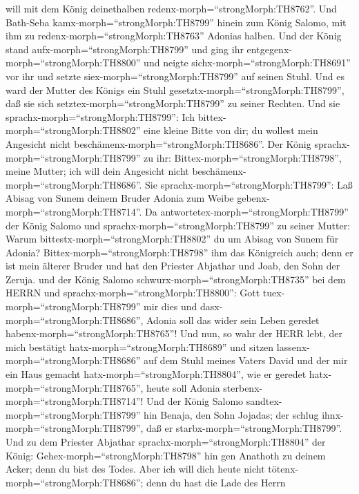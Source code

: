 will mit dem König deinethalben redenx-morph=``strongMorph:TH8762''.
 Und Bath-Seba kamx-morph=``strongMorph:TH8799'' hinein zum
König Salomo, mit ihm zu redenx-morph=``strongMorph:TH8763'' Adonias
halben. Und der König stand aufx-morph=``strongMorph:TH8799'' und ging
ihr entgegenx-morph=``strongMorph:TH8800'' und neigte
sichx-morph=``strongMorph:TH8691'' vor ihr und setzte
siex-morph=``strongMorph:TH8799'' auf seinen Stuhl. Und es ward der
Mutter des Königs ein Stuhl gesetztx-morph=``strongMorph:TH8799'', daß
sie sich setztex-morph=``strongMorph:TH8799'' zu seiner Rechten.
 Und sie sprachx-morph=``strongMorph:TH8799'': Ich
bittex-morph=``strongMorph:TH8802'' eine kleine Bitte von dir; du
wollest mein Angesicht nicht beschämenx-morph=``strongMorph:TH8686''.
Der König sprachx-morph=``strongMorph:TH8799'' zu ihr:
Bittex-morph=``strongMorph:TH8798'', meine Mutter; ich will dein
Angesicht nicht beschämenx-morph=``strongMorph:TH8686''. 
Sie sprachx-morph=``strongMorph:TH8799'': Laß Abisag von Sunem deinem
Bruder Adonia zum Weibe gebenx-morph=``strongMorph:TH8714''.
 Da antwortetex-morph=``strongMorph:TH8799'' der König
Salomo und sprachx-morph=``strongMorph:TH8799'' zu seiner Mutter: Warum
bittestx-morph=``strongMorph:TH8802'' du um Abisag von Sunem für Adonia?
Bittex-morph=``strongMorph:TH8798'' ihm das Königreich auch; denn er ist
mein älterer Bruder und hat den Priester Abjathar und Joab, den Sohn der
Zeruja.  und der König Salomo
schwurx-morph=``strongMorph:TH8735'' bei dem HERRN und
sprachx-morph=``strongMorph:TH8800'': Gott
tuex-morph=``strongMorph:TH8799'' mir dies und
dasx-morph=``strongMorph:TH8686'', Adonia soll das wider sein Leben
geredet habenx-morph=``strongMorph:TH8765''!  Und nun, so
wahr der HERR lebt, der mich bestätigt hatx-morph=``strongMorph:TH8689''
und sitzen lassenx-morph=``strongMorph:TH8686'' auf dem Stuhl meines
Vaters David und der mir ein Haus gemacht
hatx-morph=``strongMorph:TH8804'', wie er geredet
hatx-morph=``strongMorph:TH8765'', heute soll Adonia
sterbenx-morph=``strongMorph:TH8714''!  Und der König
Salomo sandtex-morph=``strongMorph:TH8799'' hin Benaja, den Sohn
Jojadas; der schlug ihnx-morph=``strongMorph:TH8799'', daß er
starbx-morph=``strongMorph:TH8799''.  Und zu dem Priester
Abjathar sprachx-morph=``strongMorph:TH8804'' der König:
Gehex-morph=``strongMorph:TH8798'' hin gen Anathoth zu deinem Acker;
denn du bist des Todes. Aber ich will dich heute nicht
tötenx-morph=``strongMorph:TH8686''; denn du hast die Lade des Herrn
